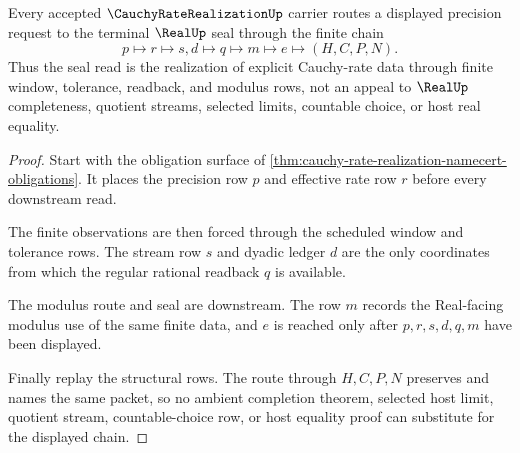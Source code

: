 \begin{theorem}
\label{thm:cauchy-rate-realization-real-seal-route}
Every accepted $\CauchyRateRealizationUp$ carrier routes a displayed precision request to the terminal $\RealUp$ seal through the finite chain
$$
p\longmapsto r\longmapsto s,d\longmapsto q\longmapsto m\longmapsto e\longmapsto(H,C,P,N).
$$
Thus the seal read is the realization of explicit Cauchy-rate data through finite window, tolerance, readback, and modulus rows, not an appeal to $\RealUp$ completeness, quotient streams, selected limits, countable choice, or host real equality.
\end{theorem}
\begin{proof}
Start with the obligation surface of \autoref{thm:cauchy-rate-realization-namecert-obligations}. It places the precision row $p$ and effective rate row $r$ before every downstream read.

The finite observations are then forced through the scheduled window and tolerance rows. The stream row $s$ and dyadic ledger $d$ are the only coordinates from which the regular rational readback $q$ is available.

The modulus route and seal are downstream. The row $m$ records the Real-facing modulus use of the same finite data, and $e$ is reached only after $p,r,s,d,q,m$ have been displayed.

Finally replay the structural rows. The route through $H,C,P,N$ preserves and names the same packet, so no ambient completion theorem, selected host limit, quotient stream, countable-choice row, or host equality proof can substitute for the displayed chain.
\end{proof}

